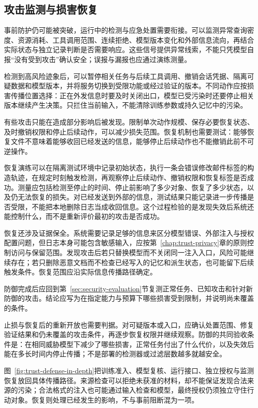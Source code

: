 \subsection{攻击监测与损害恢复}
\label{sec:security-recovery}

事前防护仍可能被突破，运行中的检测与应急处置需要衔接。可以监测异常查询密度、资源消耗、工具调用范围、连续拒绝、模型版本变化和外部信息流向，再结合实际状态与独立记录判断是否需要响应。这些信号提供异常线索，不能只凭模型自报“没有受到攻击”确认安全；误报与漏报也应通过演练测量。

检测到高风险迹象后，可以暂停相关任务与后续工具调用、撤销会话凭据、隔离可疑数据和模型版本，并将服务切换到受限功能或经过验证的版本。不同动作应按损害传播位置选择：正在外发信息时要及时关闭出口，模型已受污染时还要停止相关版本继续产生决策。只拦住当前输入，不能清除训练参数或持久记忆中的污染。

有些攻击只能在造成部分影响后被发现。限制单次动作规模、保存必要恢复状态、及时撤销权限和停止后续动作，可以减少损失范围。恢复机制也需要测试：能够恢复文件不意味着能够收回已经发送的信息，能够停止后续动作也不能撤销此前不可逆操作。

恢复演练可以在隔离测试环境中记录初始状态，执行一条会错误修改邮件标签的构造轨迹，在规定时刻触发检测，再观察停止后续动作、撤销权限和恢复标签是否成功。测量应包括检测至停止的时间、停止前影响了多少对象、恢复了多少状态，以及仍无法恢复的损失。对已经发送到外部的信息，测试结果只能记录进一步传播是否受限，不能把本地删除日志当成收回信息。这个过程检验的是发现失效后系统还能控制什么，而不是重新评价最初的攻击是否成功。

恢复还涉及证据保全。系统需要记录足够的信息来区分模型错误、外部注入与授权配置问题，但日志本身可能包含敏感输入，应按第~\ref{chap:trust-privacy}章的原则控制访问与保留范围。发现攻击后若只替换模型而不关闭同一注入入口，风险可能继续存在；若只删除恶意文档而不检查已经写入的记忆和派生状态，也可能留下后续触发条件。恢复范围应沿实际信息传播路径确定。

防御完成后应回到第~\ref{sec:security-evaluation}节复测正常任务、已知攻击和针对新防御的攻击。结论应写为在指定能力与预算下哪些损害受到限制，并说明尚未覆盖的条件。

止损与恢复后的重新开放也需要判据。对可疑版本或入口，应确认处置范围、修复验证结果和仍未覆盖的攻击条件，再逐步恢复权限并继续观察。防御的共同验收条件是：在相同威胁模型下减少了哪些损害，正常任务付出了什么代价，以及失效后能在多长时间内停止传播；不是部署的检测器或过滤层数越多就越安全。

图~\ref{fig:trust-defense-in-depth}把训练准入、模型复核、运行接口、独立授权与监测恢复放回具体传播路径。来源检查可以拒绝未获准的材料，却不能保证发现合法来源的污染；合法格式的注入也可能通过输入检查和模型，最终授权仍须独立守住行动对象。恢复则处理已经发生的影响，不与事前阻断混为一项。

